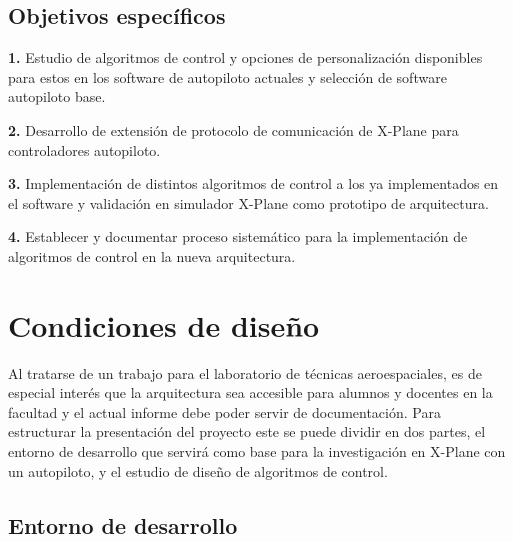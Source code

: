 \subsection{Objetivos específicos}

\textbf{1.} Estudio de algoritmos de control y opciones de personalización disponibles para estos en los software de autopiloto actuales y selección de software autopiloto base.

\textbf{2.} Desarrollo de extensión de protocolo de comunicación de X-Plane para controladores autopiloto.

\textbf{3.} Implementación de distintos algoritmos de control a los ya implementados en el software y validación en simulador X-Plane como prototipo de arquitectura.

\textbf{4.} Establecer y documentar proceso sistemático para la implementación de algoritmos de control en la nueva arquitectura.

\section{Condiciones de diseño}

Al tratarse de un trabajo para el laboratorio de técnicas aeroespaciales, es de especial interés que la arquitectura sea accesible para alumnos y docentes en la facultad y el actual informe debe poder servir de documentación. Para estructurar la presentación del proyecto este se puede dividir en dos partes, el entorno de desarrollo que servirá como base para la investigación en X-Plane con un autopiloto, y el estudio de diseño de algoritmos de control.

\subsection{Entorno de desarrollo}

